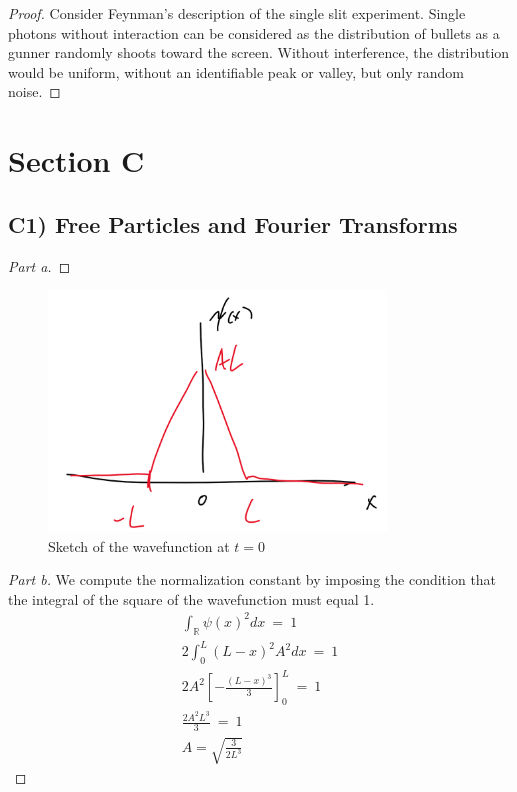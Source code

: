 \documentclass{article}
\numberwithin{equation}{section}
\begin{document}
\begin{proof}
    Consider Feynman's description of the single slit experiment. 
    Single photons without interaction can be considered as 
    the distribution of bullets as a gunner randomly shoots toward 
    the screen. Without interference, the distribution would 
    be uniform, without an identifiable peak or valley, but only random noise. 
\end{proof}

\section{Section C}

\subsection*{C1) Free Particles and Fourier Transforms}

\begin{proof}
    [Part a]
\end{proof}
\begin{figure}[htp]
    \centering
    \includegraphics[width=0.8\textwidth]{C1_sketch.png} %
    \caption{Sketch of the wavefunction at $t = 0$}
\end{figure}

\begin{proof}
    [Part b]
    We compute the normalization constant by imposing the condition 
    that the integral of the square of the wavefunction must equal 1. 
    \begin{align}
        \int_{\mathbb R}\psi(x)^2 dx \ = \ 1 \\ 
        2 \int_0^L (L - x)^2 A^2 dx \ = \ 1 \\ 
        2A^2 \left[
            -\frac{(L - x)^3}{3}
        \right]_0^L \ = \ 1 \\ 
        \frac {2A^2 L^3} 3 \ = \ 1 \\ 
        \boxed{A = \sqrt{\frac 3 {2 L^3}}}
    \end{align}
\end{proof}
\end{document}
